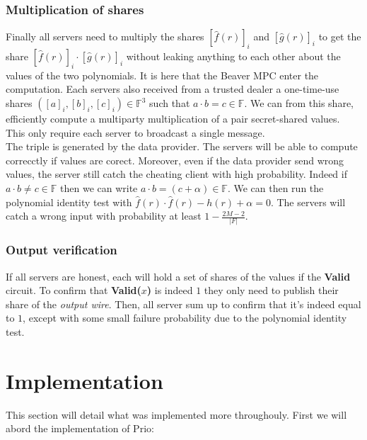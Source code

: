 \documentclass{article}
\begin{document}
\subsubsection{Multiplication of shares}
Finally all servers need to multiply the shares $ [\hat{f}(r)]_i $ and $ [\hat{g}(r)]_i$ to get the share $[\hat{f}(r)]_i \cdot [\hat{g}(r)]_i$ without leaking anything to each other about the values of the two polynomials. It is here that the Beaver MPC enter the computation. Each servers also received from a trusted dealer a one-time-use shares $([a]_i,[b]_i,[c]_i) \in \mathbb{F}^3 $ such that $a \cdot b = c \in \mathbb{F}$. We can from this share, efficiently compute a multiparty multiplication of a pair secret-shared values. This only require each server to broadcast a single message.\\
The triple is generated by the data provider. The servers will be able to compute correcctly if values are corect. Moreover, even if the data provider send wrong values, the server still catch the cheating client with high probability. Indeed if $a \cdot b \neq c \in \mathbb{F}$ then we can write $a \cdot b = (c + \alpha) \in \mathbb{F}$. We can then run the polynomial identity test with $\hat{f}(r) \cdot \hat{f}(r) - h(r) + \alpha = 0$. The servers will catch a wrong input with probability at least $1 - \frac{2M-2}{|F|}$.

\subsubsection{Output verification}
If all servers are honest, each will hold a set of shares of the values if the \textbf{Valid} circuit. To confirm that \textbf{Valid($x$)} is indeed $1$ they only need to publish their share of the \textit{output wire}. Then, all server sum up to confirm that it's indeed equal to $1$, except with some small failure probability due to the polynomial identity test.


\section{Implementation}
 This section will detail what was implemented more throughouly.
First we will abord the implementation of Prio:\\
\end{document}
